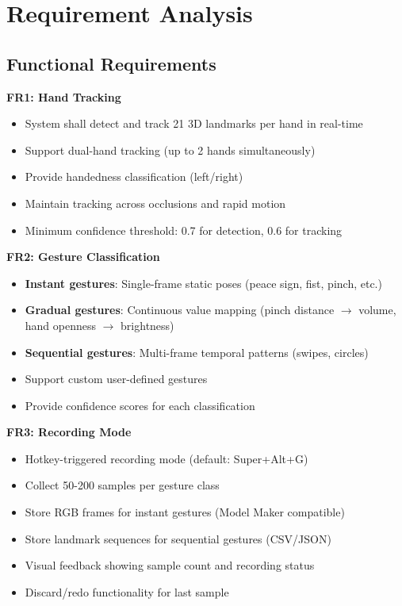 \documentclass[11pt,a4paper]{article}
\begin{document}
\section{Requirement Analysis}

\subsection{Functional Requirements}

\textbf{FR1: Hand Tracking}
\begin{itemize}
\item System shall detect and track 21 3D landmarks per hand in real-time
\item Support dual-hand tracking (up to 2 hands simultaneously)
\item Provide handedness classification (left/right)
\item Maintain tracking across occlusions and rapid motion
\item Minimum confidence threshold: 0.7 for detection, 0.6 for tracking
\end{itemize}

\textbf{FR2: Gesture Classification}
\begin{itemize}
\item \textbf{Instant gestures}: Single-frame static poses (peace sign, fist, pinch, etc.)
\item \textbf{Gradual gestures}: Continuous value mapping (pinch distance $\rightarrow$ volume, hand openness $\rightarrow$ brightness)
\item \textbf{Sequential gestures}: Multi-frame temporal patterns (swipes, circles)
\item Support custom user-defined gestures
\item Provide confidence scores for each classification
\end{itemize}

\textbf{FR3: Recording Mode}
\begin{itemize}
\item Hotkey-triggered recording mode (default: Super+Alt+G)
\item Collect 50-200 samples per gesture class
\item Store RGB frames for instant gestures (Model Maker compatible)
\item Store landmark sequences for sequential gestures (CSV/JSON)
\item Visual feedback showing sample count and recording status
\item Discard/redo functionality for last sample
\end{itemize}
\end{document}
